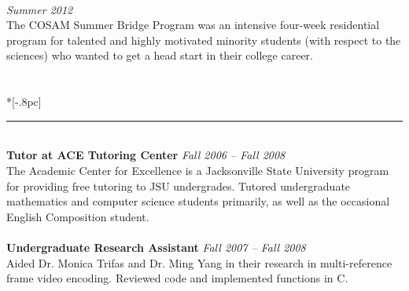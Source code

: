 \documentclass{article}
\begin{document}
\

 \hfill {\it Summer 2012}\\
The COSAM Summer Bridge Program was an intensive four-week residential
program for talented and highly motivated minority students (with
respect to the sciences) who wanted to get a head start in their college career.\\
\\
 \\*[-.8pc]
\rule{\textwidth}{.1pt} \\
{\bf Tutor at ACE Tutoring Center} \hfill \textit{Fall 2006 -- Fall 2008}\\
The Academic Center for Excellence is a Jacksonville State University program
for providing free tutoring to JSU undergrades. Tutored undergraduate
mathematics and computer science students primarily, as
well as the occasional English Composition student.\\
\\
{\bf Undergraduate Research Assistant} \hfill {\it Fall 2007 -- Fall 2008} \\
Aided Dr. Monica Trifas and Dr. Ming Yang in their research in multi-reference
frame video encoding. Reviewed code and implemented functions in C.\\
\end{document}
